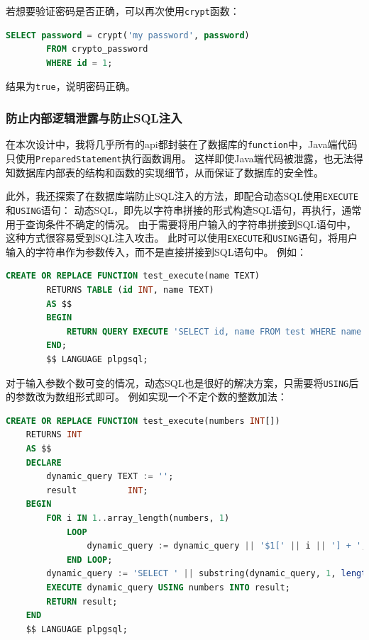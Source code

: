 \documentclass[a4paper,10pt]{ctexart}
\begin{document}
若想要验证密码是否正确，可以再次使用\texttt{crypt}函数：
\begin{center}
    \begin{lstlisting}[language=SQL]
        SELECT password = crypt('my password', password)
        FROM crypto_password
        WHERE id = 1;
    \end{lstlisting}
\end{center}

结果为\texttt{true}，说明密码正确。

\subsubsection{防止内部逻辑泄露与防止SQL注入}

在本次设计中，我将几乎所有的api都封装在了数据库的\texttt{function}中，Java端代码只使用\texttt{PreparedStatement}执行函数调用。
这样即使Java端代码被泄露，也无法得知数据库内部表的结构和函数的实现细节，从而保证了数据库的安全性。

此外，我还探索了在数据库端防止SQL注入的方法，即配合动态SQL使用\texttt{EXECUTE}和\texttt{USING}语句：
动态SQL，即先以字符串拼接的形式构造SQL语句，再执行，通常用于查询条件不确定的情况。
由于需要将用户输入的字符串拼接到SQL语句中，这种方式很容易受到SQL注入攻击。
此时可以使用\texttt{EXECUTE}和\texttt{USING}语句，将用户输入的字符串作为参数传入，而不是直接拼接到SQL语句中。
例如：
\begin{center}
    \begin{lstlisting}[language=SQL]
        CREATE OR REPLACE FUNCTION test_execute(name TEXT)
        RETURNS TABLE (id INT, name TEXT)
        AS $$
        BEGIN
            RETURN QUERY EXECUTE 'SELECT id, name FROM test WHERE name = $1' USING name;
        END;
        $$ LANGUAGE plpgsql;
    \end{lstlisting}
\end{center}

对于输入参数个数可变的情况，动态SQL也是很好的解决方案，只需要将\texttt{USING}后的参数改为数组形式即可。
例如实现一个不定个数的整数加法：
\begin{center}
    \begin{lstlisting}[language=SQL]
    CREATE OR REPLACE FUNCTION test_execute(numbers INT[])
    RETURNS INT
    AS $$
    DECLARE
        dynamic_query TEXT := '';
        result          INT;
    BEGIN
        FOR i IN 1..array_length(numbers, 1)
            LOOP
                dynamic_query := dynamic_query || '$1[' || i || '] + ';
            END LOOP;
        dynamic_query := 'SELECT ' || substring(dynamic_query, 1, length(dynamic_query) - 3);
        EXECUTE dynamic_query USING numbers INTO result;
        RETURN result;
    END
    $$ LANGUAGE plpgsql;
    \end{lstlisting}
\end{center}
\end{document}
